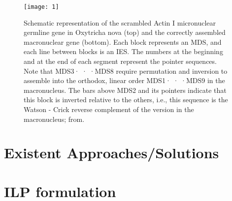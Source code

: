 \begin{figure}[h]
  \centering
    \texttt{[image: 1]}
  \caption{Schematic representation of the scrambled Actin I micronuclear germline gene in Oxytricha nova (top) and the correctly assembled macronuclear gene (bottom). Each block represents an MDS, and each line between blocks is an IES. The numbers at the beginning and at the end of each segment represent the pointer sequences. Note that MDS3· · ·MDS8 require permutation and inversion to assemble into the orthodox, linear order MDS1· · ·MDS9 in the macronucleus. The bars above MDS2 and its pointers indicate that this block is inverted relative to the others, i.e., this sequence is the Watson - Crick reverse complement of the version in the macronucleus; from\cite{prescottgreslin}.}

\end{figure}

\section{Existent Approaches/Solutions}

\section{ILP formulation}